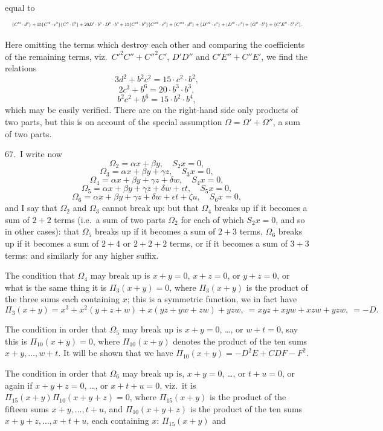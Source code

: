 \documentclass[11pt]{article}
\begin{document}
\clearpage
equal to
\[
\resizebox{\textwidth}{!}{$\displaystyle
\{C'^3 \cdot d^2\} + 15 \{C'^2 \cdot c^2\} \{C'' \cdot b^2\} + 20 D' \cdot b^3 \cdot D'' \cdot b^3 + 15 \{C'^2 \cdot b^2\} \{C''^2 \cdot c^2\} + \{C''^3 \cdot d^2\}
+ \{D''^2 \cdot c^3\} + (D'^2 \cdot c^3)
+ \{G'' \cdot b^6\} + \{C'E'' \cdot b^2c^2\}.
$}
\]

Here omitting the terms which destroy each other and comparing the coefficients of the remaining terms, viz.\ $C'^2C'' + C''^2C'$, $D'D''$ and $C'E'' + C''E'$, we find the relations
\[
3d^2 + b^2c^2 = 15 \cdot c^2 \cdot b^2,
\]
\[
2c^3 + b^6 = 20 \cdot b^3 \cdot b^3,
\]
\[
b^2c^2 + b^6 = 15 \cdot b^2 \cdot b^4,
\]
which may be easily verified. There are on the right-hand side only products of two parts, but this is on account of the special assumption $\Omega = \Omega' + \Omega''$, a sum of two parts.

67.\ I write now
\[
\Omega_2 = \alpha x + \beta y,\quad S_2 x = 0,
\]
\[
\Omega_3 = \alpha x + \beta y + \gamma z,\quad S_3 x = 0,
\]
\[
\Omega_4 = \alpha x + \beta y + \gamma z + \delta w,\quad S_4 x = 0,
\]
\[
\Omega_5 = \alpha x + \beta y + \gamma z + \delta w + \epsilon t,\quad S_5 x = 0,
\]
\[
\Omega_6 = \alpha x + \beta y + \gamma z + \delta w + \epsilon t + \zeta u,\quad S_6 x = 0,
\]
and I say that $\Omega_2$ and $\Omega_3$ cannot break up: but that $\Omega_4$ breaks up if it becomes a sum of $2 + 2$ terms (i.e.\ a sum of two parts $\Omega_2$ for each of which $S_2 x = 0$, and so in other cases): that $\Omega_5$ breaks up if it becomes a sum of $2 + 3$ terms, $\Omega_6$ breaks up if it becomes a sum of $2 + 4$ or $2 + 2 + 2$ terms, or if it becomes a sum of $3 + 3$ terms: and similarly for any higher suffix.

The condition that $\Omega_4$ may break up is $x + y = 0$, $x + z = 0$, or $y + z = 0$, or what is the same thing it is $\Pi_3 (x + y) = 0$, where $\Pi_3 (x + y)$ is the product of the three sums each containing $x$; this is a symmetric function, we in fact have
\[
\Pi_3 (x + y) = x^3 + x^2 (y + z + w) + x (yz + yw + zw) + yzw,\ = xyz + xyw + xzw + yzw,\ = -D.
\]

The condition in order that $\Omega_5$ may break up is $x + y = 0$, \ldots, or $w + t = 0$, say this is $\Pi_{10} (x + y) = 0$, where $\Pi_{10}(x + y)$ denotes the product of the ten sums $x + y, \ldots, w + t$. It will be shown that we have $\Pi_{10}(x + y) = -D^2E + CDF - F^2$.

The condition in order that $\Omega_6$ may break up is, $x + y = 0$, \ldots, or $t + u = 0$, or again if $x + y + z = 0$, \ldots, or $x + t + u = 0$, viz.\ it is $\Pi_{15} (x + y) \Pi_{10}(x + y + z) = 0$, where $\Pi_{15}(x + y)$ is the product of the fifteen sums $x + y, \ldots, t + u$, and $\Pi_{10}(x + y + z)$ is the product of the ten sums $x + y + z, \ldots, x + t + u$, each containing $x$: $\Pi_{15}(x + y)$ and
\end{document}
